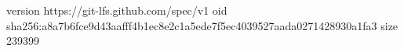 version https://git-lfs.github.com/spec/v1
oid sha256:a8a7b6fce9d43aafff4b1ec8e2c1a5ede7f5ec4039527aada0271428930a1fa3
size 239399
